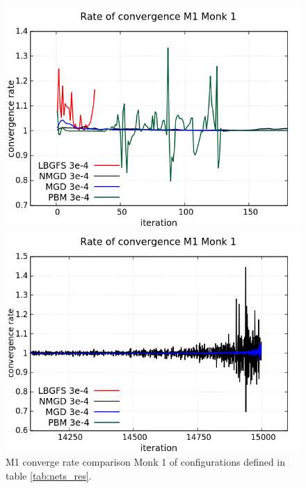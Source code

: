 \begin{figure}[H]
	\centering
	\begin{minipage}[t]{0.525\linewidth}		
		\includegraphics[width=\linewidth]{data/Comparison/Monk1/Monk1_M1_CR_zoomLeft.png}
	\end{minipage}%
	\begin{minipage}[t]{0.525\linewidth}
		\includegraphics[width=\linewidth]{data/Comparison/Monk1/Monk1_M1_CR_zoomRight.png}
	\end{minipage}
	\caption{M1 converge rate comparison Monk 1 of configurations defined in table \ref{tab:nets_res}.}
	\label{fig:CR-M1-Monk1-Zoom}
\end{figure}

